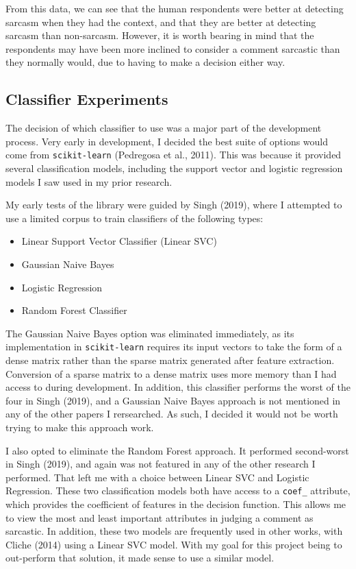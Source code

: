 \documentclass[a4paper,12pt]{article}
\begin{document}
From this data, we can see that the human respondents were better at detecting sarcasm when they had the context, and that they are better at detecting sarcasm than non-sarcasm. However, it is worth bearing in mind that the respondents may have been more inclined to consider a comment sarcastic than they normally would, due to having to make a decision either way.

\subsection{Classifier Experiments}
The decision of which classifier to use was a major part of the development process. Very early in development, I decided the best suite of options would come from \texttt{scikit-learn} (Pedregosa et al., 2011). This was because it provided several classification models, including the support vector and logistic regression models I saw used in my prior research.

My early tests of the library were guided by Singh (2019), where I attempted to use a limited corpus to train classifiers of the following types:
\begin{itemize}
  \item Linear Support Vector Classifier (Linear SVC)
  \item Gaussian Naive Bayes
  \item Logistic Regression
  \item Random Forest Classifier
\end{itemize}

The Gaussian Naive Bayes option was eliminated immediately, as its implementation in \texttt{scikit-learn} requires its input vectors to take the form of a dense matrix rather than the sparse matrix generated after feature extraction. Conversion of a sparse matrix to a dense matrix uses more memory than I had access to during development. In addition, this classifier performs the worst of the four in Singh (2019), and a Gaussian Naive Bayes approach is not mentioned in any of the other papers I rersearched. As such, I decided it would not be worth trying to make this approach work.

I also opted to eliminate the Random Forest approach. It performed second-worst in Singh (2019), and again was not featured in any of the other research I performed. That left me with a choice between Linear SVC and Logistic Regression. These two classification models both have access to a \texttt{coef\_} attribute, which provides the coefficient of features in the decision function. This allows me to view the most and least important attributes in judging a comment as sarcastic. In addition, these two models are frequently used in other works, with Cliche (2014) using a Linear SVC model. With my goal for this project being to out-perform that solution, it made sense to use a similar model.
\end{document}

